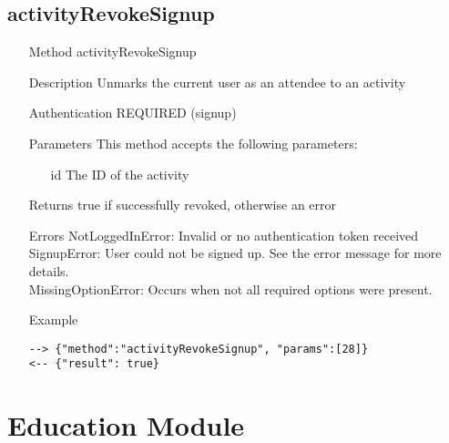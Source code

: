 \documentclass[a4paper]{scrreprt}
\begin{document}
\subsection{activityRevokeSignup}
\begin{enumerate}
\item[Method] activityRevokeSignup
\item[Description] Unmarks the current user as an attendee to an activity
\item[Authentication] REQUIRED (signup)
\item[Parameters] This method accepts the following parameters:
\begin{enumerate}
	\item[id] The ID of the activity
    \end{enumerate}
\item[Returns] true if successfully revoked, otherwise an error
\item[Errors]
	NotLoggedInError: Invalid or no authentication token received \\
	SignupError: User could not be signed up. See the error message for more details. \\
    MissingOptionError: Occurs when not all required options were present.
\item[Example]
\begin{lstlisting}
--> {"method":"activityRevokeSignup", "params":[28]}
<-- {"result": true}
\end{lstlisting}
\end{enumerate}


\clearpage
\section{Education Module}
\end{document}
